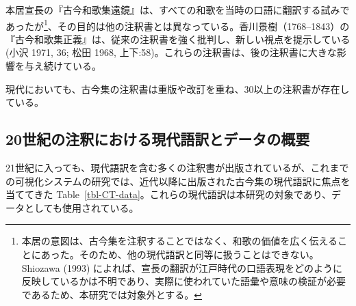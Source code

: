 \documentclass[
  letterpaper,
  DIV=11,
  numbers=noendperiod]{scrartcl}
\begin{document}
本居宣長の『古今和歌集遠鏡』は、すべての和歌を当時の口語に翻訳する試みであったが\footnote{本居の意図は、古今集を注釈することではなく、和歌の価値を広く伝えることにあった。そのため、他の現代語訳と同等に扱うことはできない。Shiozawa
  (1993)
  によれば、宣長の翻訳が江戸時代の口語表現をどのように反映しているかは不明であり、実際に使われていた語彙や意味の検証が必要であるため、本研究では対象外とする。}、その目的は他の注釈書とは異なっている。香川景樹（1768--1843）の『古今和歌集正義』は、従来の注釈書を強く批判し、新しい視点を提示している
(小沢 1971, 36; 松田 1968,
上下:58)。これらの注釈書は、後の注釈書に大きな影響を与え続けている。

現代においても、古今集の注釈書は重版や改訂を重ね、30以上の注釈書が存在している。

\begin{table}

\caption{\label{tbl-annotation}近代前（1600--1868）の古今集の代表的な注釈書
Representative annotated bookss of \emph{Kokinshū} before modern times
(1600--1868)}


\end{table}%

\subsection{20世紀の注釈における現代語訳とデータの概要}\label{ux4e16ux7d00ux306eux6ce8ux91c8ux306bux304aux3051ux308bux73feux4ee3ux8a9eux8a33ux3068ux30c7ux30fcux30bfux306eux6982ux8981}

21世紀に入っても、現代語訳を含む多くの注釈書が出版されているが、これまでの可視化システムの研究では、近代以降に出版された古今集の現代語訳に焦点を当ててきた
Table~\ref{tbl-CT-data}。これらの現代語訳は本研究の対象であり、データとしても使用されている。
\end{document}
